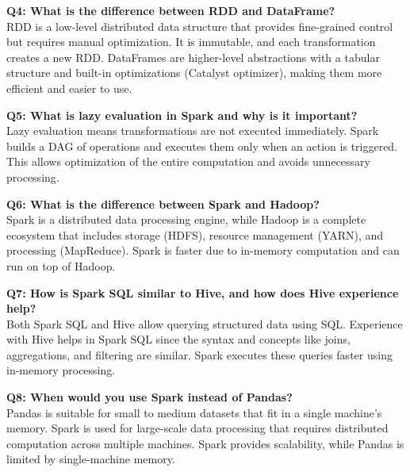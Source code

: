 \documentclass[10pt,a4paper]{article}
\begin{document}
	\vspace{0.5em}
	
	\textbf{Q4: What is the difference between RDD and DataFrame?} \\
	RDD is a low-level distributed data structure that provides fine-grained control but requires manual optimization. It is immutable, and each transformation creates a new RDD. DataFrames are higher-level abstractions with a tabular structure and built-in optimizations (Catalyst optimizer), making them more efficient and easier to use.
	
	\vspace{0.5em}
	
	\textbf{Q5: What is lazy evaluation in Spark and why is it important?} \\
	Lazy evaluation means transformations are not executed immediately. Spark builds a DAG of operations and executes them only when an action is triggered. This allows optimization of the entire computation and avoids unnecessary processing.
	
	\vspace{0.5em}
	
	\textbf{Q6: What is the difference between Spark and Hadoop?} \\
	Spark is a distributed data processing engine, while Hadoop is a complete ecosystem that includes storage (HDFS), resource management (YARN), and processing (MapReduce). Spark is faster due to in-memory computation and can run on top of Hadoop.
	
	\vspace{0.5em}
	
	\textbf{Q7: How is Spark SQL similar to Hive, and how does Hive experience help?} \\
	Both Spark SQL and Hive allow querying structured data using SQL. Experience with Hive helps in Spark SQL since the syntax and concepts like joins, aggregations, and filtering are similar. Spark executes these queries faster using in-memory processing.
	
	\vspace{0.5em}
	
	\textbf{Q8: When would you use Spark instead of Pandas?} \\
	Pandas is suitable for small to medium datasets that fit in a single machine’s memory. Spark is used for large-scale data processing that requires distributed computation across multiple machines. Spark provides scalability, while Pandas is limited by single-machine memory.
	
\end{document}
